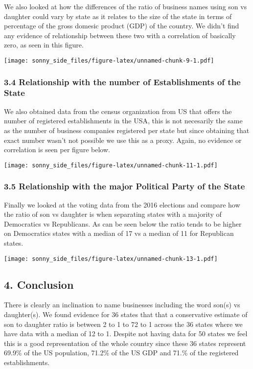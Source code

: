 \documentclass[]{article}
\begin{document}
We also looked at how the differences of the ratio of business names
using son vs daughter could vary by state as it relates to the size of
the state in terms of percentage of the gross domesic product (GDP) of
the country. We didn't find any evidence of relationship between these
two with a correlation of basically zero, as seen in this figure.

\texttt{[image: sonny\_side\_files/figure-latex/unnamed-chunk-9-1.pdf]}

\hypertarget{relationship-with-the-number-of-establishments-of-the-state}{%
\subsubsection{3.4 Relationship with the number of Establishments of the
State}\label{relationship-with-the-number-of-establishments-of-the-state}}

We also obtained data from the census organization from US that offers
the number of registered establishments in the USA, this is not
necesarily the same as the number of business companies registered per
state but since obtaining that exact number wasn't not possible we use
this as a proxy. Again, no evidence or correlation is seen per figure
below.

\texttt{[image: sonny\_side\_files/figure-latex/unnamed-chunk-11-1.pdf]}

\hypertarget{relationship-with-the-major-political-party-of-the-state}{%
\subsubsection{3.5 Relationship with the major Political Party of the
State}\label{relationship-with-the-major-political-party-of-the-state}}

Finally we looked at the voting data from the 2016 elections and compare
how the ratio of son vs daughter is when separating states with a
majority of Democratics vs Republicans. As can be seen below the ratio
tends to be higher on Democratics states with a median of 17 vs a median
of 11 for Republican states.

\texttt{[image: sonny\_side\_files/figure-latex/unnamed-chunk-13-1.pdf]}

\hypertarget{conclusion}{%
\subsection{4. Conclusion}\label{conclusion}}

There is clearly an inclination to name businesses including the word
son(s) vs daughter(s). We found evidence for 36 states that that a
conservative estimate of son to daughter ratio is between 2 to 1 to 72
to 1 across the 36 states where we have data with a median of 12 to 1.
Despite not having data for 50 states we feel this is a good
representation of the whole country since these 36 states represent
69.9\% of the US population, 71.2\% of the US GDP and 71.\% of the
registered establishments.
\end{document}
